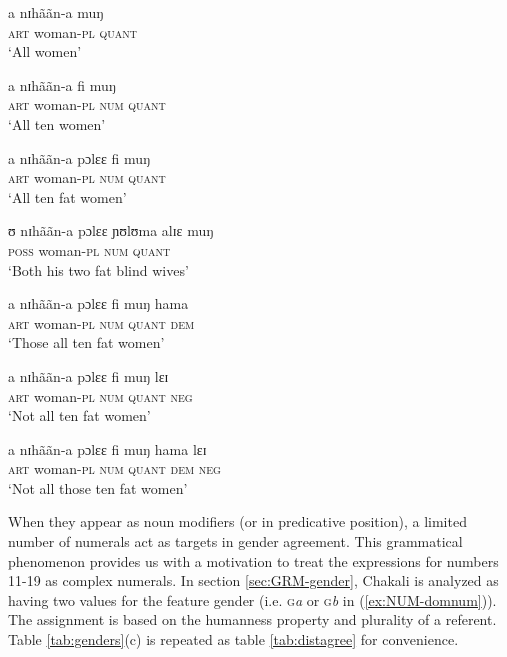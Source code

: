 \begin{exe}
  \ex\label{ex:npstrucall}
  \begin{xlist}

    \ex\label{ex:all-w}
\gll a nɪhããn-a muŋ\\
\textsc{art} {woman-\textsc{pl}} \textsc{quant}\\
\glt `All women'

 \ex\label{ex:all-ten-w}
\gll a nɪhããn-a fi muŋ\\
\textsc{art} {woman-\textsc{pl}} \textsc{num} \textsc{quant}\\
\glt `All ten women'


\ex\label{ex:all-fat-ten-w}
\gll a nɪhããn-a pɔlɛɛ fi muŋ\\
\textsc{art} {woman-\textsc{pl}} {\qual} \textsc{num} \textsc{quant}\\
\glt `All ten fat women'

\ex\label{ex:all-fat-blind-two-w}
\gll ʊ nɪhããn-a  pɔlɛɛ ɲʊlʊma  alɪɛ muŋ\\
\textsc{poss} {woman-\textsc{pl}} {\qual}  {\qual} \textsc{num} 
\textsc{quant}\\
\glt `Both his two fat blind wives'

\ex\label{ex:all-fat-ten-w-those}
\gll a nɪhããn-a pɔlɛɛ fi muŋ  hama\\
\textsc{art} {woman-\textsc{pl}} {\qual} \textsc{num} \textsc{quant}
\textsc{dem}\\
\glt `Those all ten fat women'


\ex\label{ex:all-fat-ten-w-n}
\gll a nɪhããn-a pɔlɛɛ fi muŋ  lɛɪ\\
\textsc{art} {woman-\textsc{pl}} {\qual} \textsc{num} \textsc{quant}
\textsc{neg}\\
\glt `Not all ten fat women'




 \ex\label{ex:full-temp}
\gll a nɪhããn-a pɔlɛɛ fi muŋ hama  lɛɪ\\
\textsc{art} {woman-\textsc{pl}} {\qual}  \textsc{num} \textsc{quant}
\textsc{dem}
\textsc{neg}\\
\glt `Not all those ten fat  women'

  \end{xlist}
\end{exe}

When they appear as noun modifiers  (or in predicative position),  a limited
number of numerals act as targets in gender agreement.  This grammatical
phenomenon provides us with a  motivation to treat  the expressions for numbers
11-19 as complex numerals.
In section \ref{sec:GRM-gender},  Chakali is analyzed as having two values for
the
feature gender (i.e. \textsc{g}{\it a} or \textsc{g}{\it b} in
(\ref{ex:NUM-domnum})). The assignment is based on the humanness property and
plurality of a referent.  Table \ref{tab:genders}(c) is repeated as table 
\ref{tab:distagree} for convenience. 


